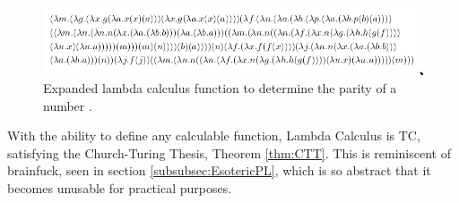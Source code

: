 \begin{figure}[htb]
    \centering
    \includegraphics[width=16cm]{Images/oddevenlambda.png}
       \caption{Expanded lambda calculus function to determine the parity of a number \cite{RedditLambdaCalcPost,RedditLambdaCalcComment}.}
           \label{fig:OddEvenLambda}
\end{figure}

With the ability to define any calculable function, Lambda Calculus is TC, satisfying the Church-Turing Thesis, Theorem \ref{thm:CTT}.
This is reminiscent of brainfuck, seen in section \ref{subsubsec:EsotericPL}, which is so abstract that it becomes unusable for practical purposes.